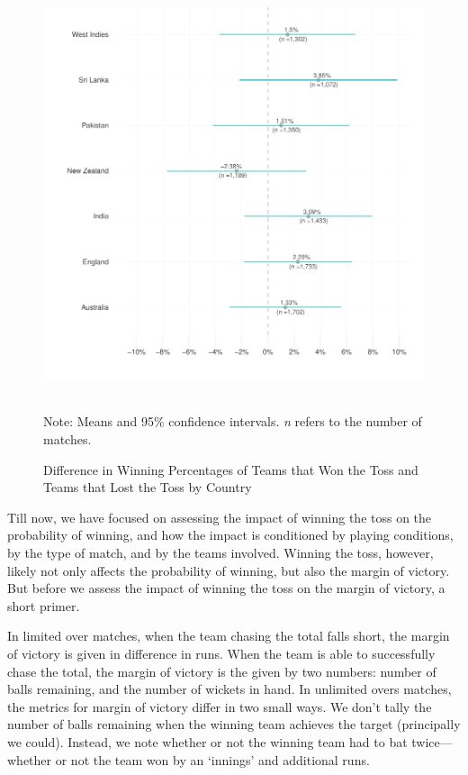 \documentclass[12pt]{article}
\begin{document}
\begin{figure}[htbp]
\centering
\caption{Difference in Winning Percentages of Teams that Won the Toss and Teams that Lost the Toss by Country}
\includegraphics[scale=1]{../figs/winbyCountry.pdf}
{\footnotesize \\ Note: Means and 95\% confidence intervals. \emph{n} refers to the number of matches.\par}
\label{fig:country}
\end{figure}

Till now, we have focused on assessing the impact of winning the toss on the probability of winning, and how the impact is conditioned by playing conditions, by the type of match, and by the teams involved. Winning the toss, however, likely not only affects the probability of winning, but also the margin of victory. But before we assess the impact of winning the toss on the margin of victory, a short primer. 

In limited over matches, when the team chasing the total falls short, the margin of victory is given in difference in runs. When the team is able to successfully chase the total, the margin of victory is the given by two numbers: number of balls remaining, and the number of wickets in hand. In unlimited overs matches, the metrics for margin of victory differ in two small ways. We don't tally the number of balls remaining when the winning team achieves the target (principally we could). Instead, we note whether or not the winning team had to bat twice---whether or not the team won by an `innings' and additional runs.
\end{document}
